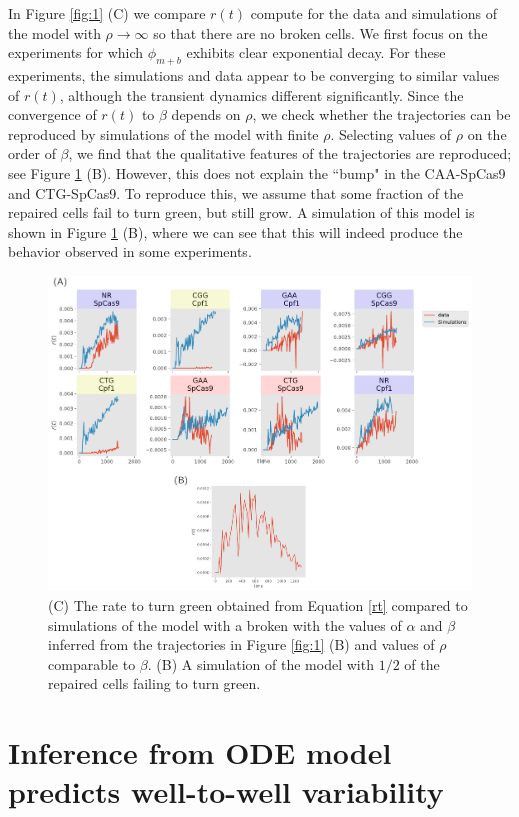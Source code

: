 \documentclass{article}
\begin{document}
In Figure \ref{fig:1} (C) we compare $r(t)$ compute for the data and simulations of the model with $\rho \to \infty$ so that there are no broken cells. We first focus on the experiments for which $\phi_{m+b}$ exhibits clear exponential decay. For these experiments, the simulations and data appear to be converging to similar values of $r(t)$, although the transient dynamics different significantly. Since the convergence of $r(t)$ to $\beta$ depends on $\rho$, we check whether the trajectories can be reproduced by simulations of the model with finite $\rho$. Selecting values of $\rho$ on the order of $\beta$, we find that the qualitative features of the trajectories are reproduced; see  Figure \ref{fig:2} (B). However, this does not explain the ``bump" in the CAA-SpCas9 and CTG-SpCas9. To reproduce this, we assume that some fraction of the repaired cells fail to turn green, but still grow. A simulation of this model is shown in Figure \ref{fig:2} (B), where we can see that this will indeed produce the behavior observed in some experiments. 


\begin{figure}[h!]
\centering
\includegraphics[scale=0.6]{fig2.pdf}
\caption{ (C) The rate to turn green obtained from Equation \ref{rt} compared to simulations of the model with a broken with the values of $\alpha$ and $\beta$ inferred from the trajectories in Figure \ref{fig:1} (B) and values of $\rho$ comparable to $\beta$. (B) A simulation of the model with $1/2$ of the repaired cells failing to turn green.  }\label{fig:2}
\end{figure}


\section{Inference from ODE model predicts well-to-well variability}
\end{document}

